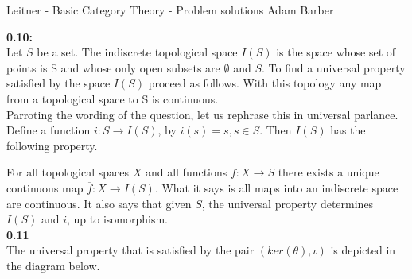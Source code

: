 \documentclass{article}
\begin{document}
Leitner - Basic Category Theory - Problem solutions
Adam Barber


\textbf{0.10:} \\

Let $S$ be a set. The indiscrete topological space $I(S)$ is the space whose set of points is S and whose only open subsets are $\emptyset$ and $S$.
To find a universal property satisfied by the space $I(S)$ proceed as follows.
With this topology any map from a topological space to S is continuous. \\

Parroting the wording of the question, let us rephrase this in
universal parlance. Define a function $i: S \rightarrow I(S)$, by $i(s) = s, s \in S$.
Then $I(S)$ has the following property.


\begin{center}
\end{center}

For all topological spaces $X$ and all functions
$f: X \rightarrow S$ there exists a unique continuous map $\overline{f}: X \rightarrow I(S)$. What it says is all maps into an indiscrete space are continuous. It also says that given $S$, the universal property determines $I(S)$ and $i$, up to isomorphism. \\

\textbf{0.11} \\
The universal property that is satisfied by the pair $(ker(\theta),\iota)$ is depicted in the diagram below.

\begin{center}
\end{center}
\end{document}

